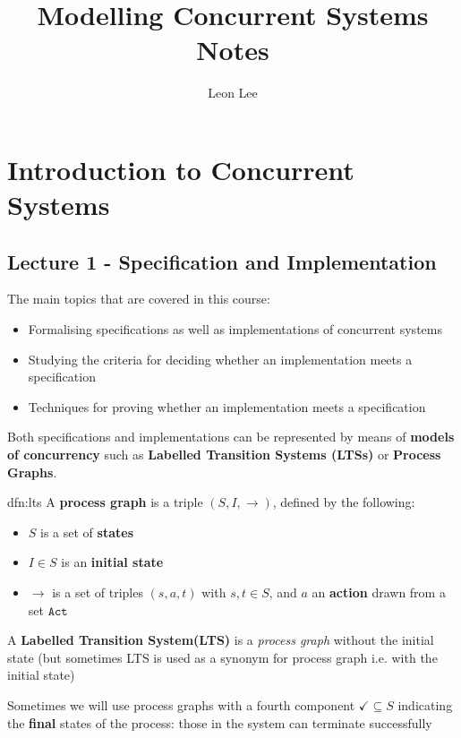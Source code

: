 \documentclass{article}
\title{Modelling Concurrent Systems Notes}
\author{Leon Lee}
\begin{document}
\maketitle
\newpage
\tableofcontents
\newpage

\section{Introduction to Concurrent Systems}
\subsection{Lecture 1 - Specification and Implementation}
The main topics that are covered in this course:
\begin{itemize}
    \item Formalising specifications as well as implementations of concurrent systems
    \item Studying the criteria for deciding whether an implementation meets a specification
    \item Techniques for proving whether an implementation meets a specification
\end{itemize}

Both specifications and implementations can be represented by means of \textbf{models of concurrency} such as \textbf{Labelled Transition Systems (LTSs)} or \textbf{Process Graphs}.

\begin{dfn}{dfn:lts}{}
    A \textbf{process graph} is a triple $(S, I, \to)$, defined by the following:

    \begin{itemize}
        \item $S$ is a set of \textbf{states}
        \item $I\in S$ is an \textbf{initial state}
        \item $\to$ is a set of triples $(s, a, t)$ with $s, t\in S$, and $a$ an \textbf{action} drawn from a set $\mathtt{Act}$
    \end{itemize}

    \longrule{0.08ex}

    A \textbf{Labelled Transition System(LTS)} is a \textit{process graph} without the initial state (but sometimes LTS is used as a synonym for process graph i.e. with the initial state)

    \longrule{0.08ex}

    Sometimes we will use process graphs with a fourth component $\checkmark \subseteq S$ indicating the \textbf{final} states of the process: those in the system can terminate successfully
\end{dfn}
\end{document}
